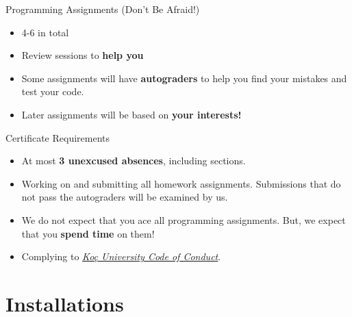 		\begin{frame}{Programming Assignments \pause (Don't Be Afraid!)}
			\pause
			\pause
			\begin{itemize}
				\LARGE
				\item 4-6 in total
				\pause
				\item Review sessions to \textbf{help you}
				\pause
				\item Some assignments will have \textbf{autograders} to help you find your mistakes and test your code.
				\pause
				\item Later assignments will be based on \textbf{your interests!}
			\end{itemize}
			{
			
				\begin{center}
				\end{center}
			}
			
		\end{frame}

		\begin{frame}{Certificate Requirements}
			\pause
			\begin{itemize}
				\LARGE
				\item At most \textbf{3 unexcused absences}, including sections.
				\pause
				\item Working on and submitting all homework assignments. Submissions that do not pass the autograders will be examined by us.
				\pause
				\item We do not expect that you ace all programming assignments. But, we expect that you \textbf{spend time} on them!
				\pause
				\item Complying to \href{https://vpaa.ku.edu.tr/academic/student-code-of-conduct}{\underline{\textit{Koç University Code of Conduct}}}. 
			\end{itemize}
		\end{frame}

	\section{Installations}

